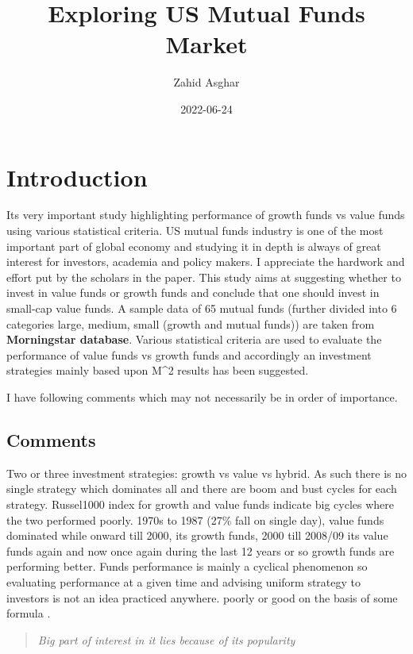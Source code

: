 \documentclass[]{tufte-handout}
\title[Growth vs Value Funds Investment]{Exploring US Mutual Funds
Market}
\author{Zahid Asghar}
\date{2022-06-24}
\begin{document}
\maketitle




\hypertarget{introduction}{%
\section{Introduction}\label{introduction}}

Its very important study highlighting performance of growth funds vs
value funds using various statistical criteria. US mutual funds industry
is one of the most important part of global economy and studying it in
depth is always of great interest for investors, academia and policy
makers. I appreciate the hardwork and effort put by the scholars in the
paper. This study aims at suggesting whether to invest in value funds or
growth funds and conclude that one should invest in small-cap value
funds. A sample data of 65 mutual funds (further divided into 6
categories large, medium, small (growth and mutual funds)) are taken
from \textbf{Morningstar database}. Various statistical criteria are
used to evaluate the performance of value funds vs growth funds and
accordingly an investment strategies mainly based upon M\^{}2 results
has been suggested.

I have following comments which may not necessarily be in order of
importance.

\hypertarget{comments}{%
\subsection{Comments}\label{comments}}

Two or three investment strategies: growth vs value vs hybrid. As such
there is no single strategy which dominates all and there are boom and
bust cycles for each strategy. Russel1000 index for growth and value
funds indicate big cycles where the two performed poorly. 1970s to 1987
(27\% fall on single day), value funds dominated while onward till 2000,
its growth funds, 2000 till 2008/09 its value funds again and now once
again during the last 12 years or so growth funds are performing better.
Funds performance is mainly a cyclical phenomenon so evaluating
performance at a given time and advising uniform strategy to investors
is not an idea practiced anywhere. poorly or good on the basis of some
formula .

\begin{quote}
\emph{Big part of interest in it lies because of its popularity}
\end{quote}
\end{document}
